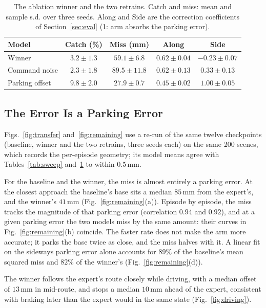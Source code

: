 \documentclass[conference]{IEEEtran}
\begin{document}
\begin{table}[t]
\centering
\caption{The ablation winner and the two retrains. Catch and miss: mean and sample s.d. over three seeds. Along and Side are the correction coefficients of Section~\ref{sec:eval} (1: arm absorbs the parking error).}
\label{tab:three}
\footnotesize
\setlength{\tabcolsep}{4pt}
\begin{tabular}{lcccc}
\toprule
Model & Catch (\%) & Miss (mm) & Along & Side \\
\midrule
Winner & $3.2\pm 1.3$ & $59.1\pm 6.8$ & $0.62\pm 0.04$ & $-0.23\pm 0.07$ \\
Command noise & $2.3\pm 1.8$ & $89.5\pm 11.8$ & $0.62\pm 0.13$ & $0.33\pm 0.13$ \\
Parking offset & $\mathbf{9.8\pm 2.0}$ & $\mathbf{27.9\pm 0.7}$ & $0.45\pm 0.02$ & $\mathbf{1.00\pm 0.05}$ \\
\bottomrule
\end{tabular}
\end{table}

\subsection{The Error Is a Parking Error}
\label{sec:parking}
Figs.~\ref{fig:transfer} and~\ref{fig:remaining} use a re-run of the same twelve checkpoints (baseline, winner and the two retrains, three seeds each) on the same 200 scenes, which records the per-episode geometry; its model means agree with Tables~\ref{tab:sweep} and~\ref{tab:three} to within $0.5\,\mathrm{mm}$.

For the baseline and the winner, the miss is almost entirely a parking error. At the closest approach the baseline's base sits a median $85\,\mathrm{mm}$ from the expert's, and the winner's $41\,\mathrm{mm}$ (Fig.~\ref{fig:remaining}(a)). Episode by episode, the miss tracks the magnitude of that parking error (correlation $0.94$ and $0.92$), and at a given parking error the two models miss by the same amount: their curves in Fig.~\ref{fig:remaining}(b) coincide. The faster rate does not make the arm more accurate; it parks the base twice as close, and the miss halves with it. A linear fit on the sideways parking error alone accounts for $89\%$ of the baseline's mean squared miss and $82\%$ of the winner's (Fig.~\ref{fig:remaining}(d)).

The winner follows the expert's route closely while driving, with a median offset of $13\,\mathrm{mm}$ in mid-route, and stops a median $10\,\mathrm{mm}$ ahead of the expert, consistent with braking later than the expert would in the same state (Fig.~\ref{fig:driving}).
\end{document}
